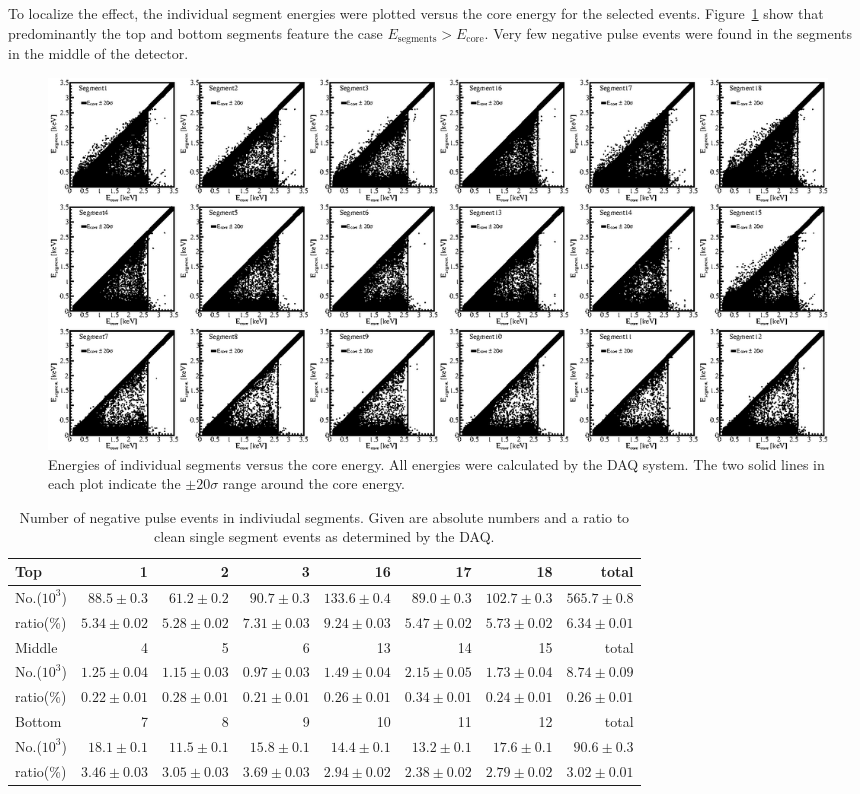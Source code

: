 To localize the effect, the individual segment energies were plotted
versus the core energy for the selected
events. Figure~\ref{fig:np:EnegPulse} show that predominantly the top
and bottom segments feature the case $E_{\text{segments}} >
E_{\text{core}}$. Very few negative pulse events were found in the
segments in the middle of the detector.

 
\begin{figure}
\centering
\includegraphics{EnegPuls}
\caption{Energies of individual segments versus the core energy. All
energies were calculated by the DAQ system. The two solid lines in
each plot indicate the $\pm 20 \sigma$ range around the core energy.}
\label{fig:np:EnegPulse}
\end{figure}

\begin{table}[tbhp]
\centering
\caption{Number of negative pulse events in indiviudal segments.
Given are absolute numbers and a ratio to clean single segment
events as determined by the DAQ.} 
\label{tab:np:nenum}
\begin{tabular}{l|rrr|rrr|r} \hline
Top  & 1 & 2 & 3 & 16 & 17 & 18 & total \\\hline
No.($10^{3}$)&$88.5\pm0.3$&$61.2\pm0.2$&$90.7\pm0.3$&$133.6\pm0.4$&$89.0\pm0.3$&$102.7\pm0.3$&$565.7\pm0.8$\\ 
ratio(\%)&$5.34\pm0.02$&$5.28\pm0.02$&$7.31\pm0.03$&$9.24\pm0.03$&$5.47\pm0.02$&$5.73\pm0.02$&$6.34\pm0.01$\\ \hline
Middle& 4 & 5 & 6 & 13 & 14 & 15 & total \\ \hline
No.($10^{3}$)&$1.25\pm0.04$&$1.15\pm0.03$&$0.97\pm0.03$&$1.49\pm0.04$&$2.15\pm0.05$&$1.73\pm0.04$&$8.74\pm0.09$\\ 
ratio(\%)&$0.22\pm0.01$&$0.28\pm0.01$&$0.21\pm0.01$&$0.26\pm0.01$&$0.34\pm0.01$&$0.24\pm0.01$&$0.26\pm0.01$\\ \hline
Bottom& 7 & 8 & 9 & 10 & 11 & 12 & total \\ \hline
No.($10^{3}$)&$18.1\pm0.1$&$11.5\pm0.1$&$15.8\pm0.1$&$14.4\pm0.1$&$13.2\pm0.1$&$17.6\pm0.1$&$90.6\pm0.3$\\ 
ratio(\%)&$3.46\pm0.03$&$3.05\pm0.03$&$3.69\pm0.03$&$2.94\pm0.02$&$2.38\pm0.02$&$2.79\pm0.02$&$3.02\pm0.01$\\ \hline 
\end{tabular}
\end{table}

